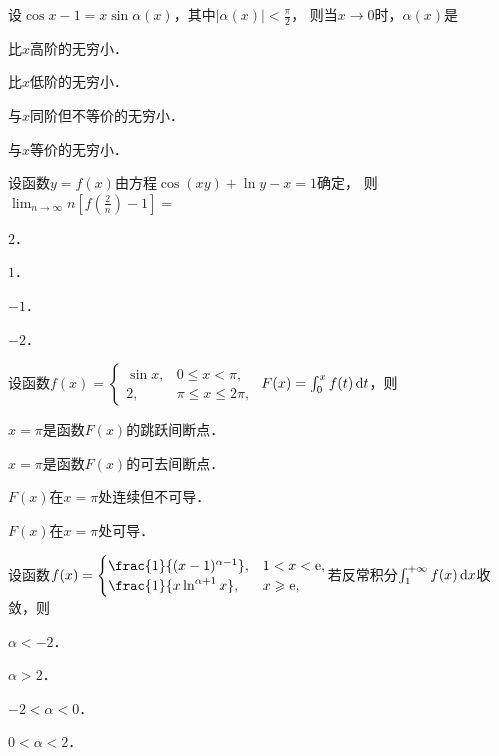 \documentclass[plain,noanswer,medmath]{../../template/jnuexam}
\begin{document}






\begin{problem}
设$\cos x - 1 = x\sin \alpha(x)$，其中$\left| \alpha(x) \right| < \frac{\pi}{2}$，
则当$x \to 0$时，$\alpha (x)$是\pickout{}
\begin{abcd}
\item 比$x$高阶的无穷小．
\item 比$x$低阶的无穷小．
\item 与$x$同阶但不等价的无穷小．
\item 与$x$等价的无穷小．
\end{abcd}
\end{problem}


\begin{problem}
设函数$y = f(x)$由方程$\cos (xy) + \ln y - x = 1$确定，
则$\lim_{n \to \infty} n\left[f\left(\frac{2}{n} \right) - 1 \right] =$\pickout{}
\begin{abcd}
\item $2$．
\item $1$．
\item $- 1$．
\item $- 2$．
\end{abcd}
\end{problem}


\begin{problem}
设函数$f(x) = \begin{cases}
  \sin x, & 0 \le x < \pi , \\
       2, & \pi \le x \le 2\pi ,
\end{cases}$ $F(x) = \int_0^x f(t) \mathop{}\!\mathrm{d} t$，则\pickout{}
\begin{abcd}
\item $x = \pi$是函数$F(x)$的跳跃间断点．
\item $x = \pi$是函数$F(x)$的可去间断点．
\item $F(x)$在$x = \pi$处连续但不可导．
\item $F(x)$在$x = \pi$处可导．
\end{abcd}
\end{problem}


\begin{problem}
设函数$f(x) =\begin{cases}
  \frac{1}{(x - 1)^{\alpha - 1}}, & 1 < x < \e, \\
   \frac{1}{x\ln^{\alpha + 1} x}, & x \ge \e,
\end{cases}$若反常积分$\int_1^{+\infty} f(x) \mathop{}\!\mathrm{d} x$收敛，则\pickout{}
\begin{abcd}
\item $\alpha < - 2$．
\item $\alpha > 2$．
\item $- 2 < \alpha < 0$．
\item $0 < \alpha < 2$．
\end{abcd}
\end{problem}
\end{document}

